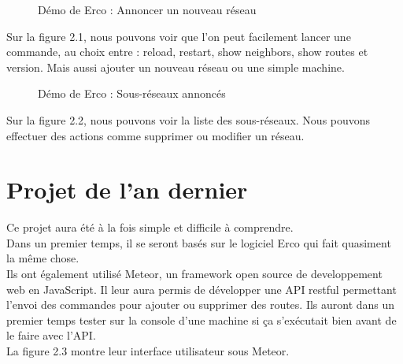 \begin{figure}[H]
\caption{Démo de Erco : Annoncer un nouveau réseau}
\end{figure}

Sur la figure 2.1, nous pouvons voir que l'on peut facilement lancer une commande, au choix entre : reload, restart, show neighbors, show routes et version. Mais aussi ajouter un nouveau réseau ou une simple machine.

\begin{figure}[H]
\caption{Démo de Erco : Sous-réseaux annoncés}
\end{figure}

Sur la figure 2.2, nous pouvons voir la liste des sous-réseaux. Nous pouvons effectuer des actions comme supprimer ou modifier un réseau.

\section{Projet de l'an dernier}
Ce projet aura été à la fois simple et difficile à comprendre. \\ \indent
Dans un premier temps, il se seront basés sur le logiciel Erco qui fait quasiment la même chose. \\ \indent
Ils ont également utilisé Meteor, un framework open source de developpement web en JavaScript.
Il leur aura permis de développer une API restful permettant l'envoi des commandes pour ajouter ou supprimer des routes. Ils auront dans un premier temps tester sur la console d'une machine si ça s'exécutait bien avant de le faire avec l'API. \\ \indent
La figure 2.3 montre leur interface utilisateur sous Meteor.


